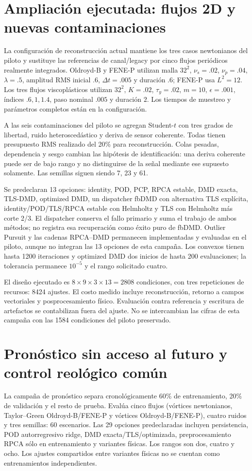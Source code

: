 \documentclass[11pt,oneside,openany]{book}
\begin{document}
\section{Ampliación ejecutada: flujos 2D y nuevas contaminaciones}
La configuración de reconstrucción actual mantiene los tres casos
newtonianos del piloto y sustituye las referencias de canal/legacy por cinco
flujos periódicos realmente integrados. Oldroyd-B y FENE-P utilizan malla
$32^2$, $\nu_s=.02$, $\nu_p=.04$, $\lambda=.5$, amplitud RMS inicial $.6$,
$\Delta t=.005$ y duración $.6$; FENE-P usa $L^2=12$. Los tres flujos
viscoplásticos utilizan $32^2$, $K=.02$, $\tau_y=.02$, $m=10$,
$\epsilon=.001$, índices $.6,1,1.4$, paso nominal $.005$ y duración $2$.
Los tiempos de muestreo y parámetros completos están en la configuración.

A las seis contaminaciones del piloto se agregan Student-$t$ con tres
grados de libertad, ruido heteroscedástico y deriva de sensor coherente.
Todas tienen presupuesto RMS realizado del 20\% para reconstrucción.
Colas pesadas, dependencia y sesgo cambian las hipótesis de identificación:
una deriva coherente puede ser de bajo rango y no distinguirse de la señal
mediante ese supuesto solamente. Las semillas siguen siendo 7, 23 y 61.

Se predeclaran 13 opciones: identity, POD, PCP, RPCA estable, DMD exacta,
TLS-DMD, optimized DMD, un dispatcher fbDMD con alternativa TLS explícita,
identity/POD/TLS/RPCA estable con Helmholtz y TLS con Helmholtz más corte 2/3.
El dispatcher conserva el fallo primario y suma el trabajo de ambos métodos;
no registra esa recuperación como éxito puro de fbDMD. Outlier Pursuit y las
cadenas RPCA--DMD permanecen implementadas y evaluadas en el piloto, aunque
no integran las 13 opciones de esta campaña. Los convexos tienen hasta
1200 iteraciones y optimized DMD dos inicios de hasta 200 evaluaciones;
la tolerancia permanece $10^{-5}$ y el rango solicitado cuatro.

El diseño ejecutado es $8\times9\times3\times13=2808$ condiciones,
con tres repeticiones de recursos: 8424 ajustes. El costo medido incluye
reconstrucción, retorno a campos vectoriales y posprocesamiento físico.
Evaluación contra referencia y escritura de artefactos se contabilizan
fuera del ajuste. No se intercambian las cifras de esta campaña con las
1584 condiciones del piloto preservado.

\section{Pronóstico sin acceso al futuro y control reológico común}
La campaña de pronóstico separa cronológicamente 60\% de entrenamiento,
20\% de validación y el resto de prueba. Evalúa cinco flujos (vórtices
newtonianos, Taylor--Green Oldroyd-B/FENE-P y vórtices Oldroyd-B/FENE-P),
cuatro ruidos y tres semillas: 60 escenarios. Las 29 opciones predeclaradas
incluyen persistencia, POD autorregresivo ridge, DMD exacta/TLS/optimizada,
preprocesamiento RPCA sólo en entrenamiento y variantes físicas. Los rangos
son dos, cuatro y ocho. Los ajustes compartidos entre variantes físicas no
se cuentan como entrenamientos independientes.
\end{document}
